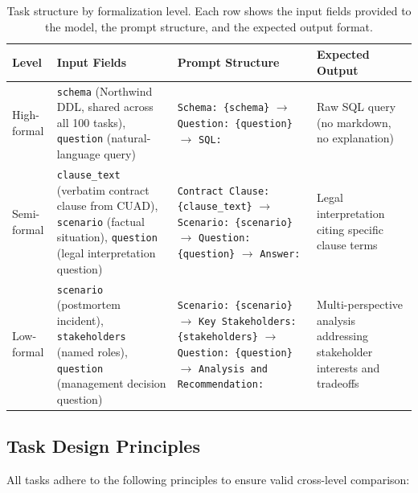 \documentclass[runningheads]{llncs}
\begin{document}
\begin{table}[t]
\centering
\caption{Task structure by formalization level. Each row shows the input fields provided to the model, the prompt structure, and the expected output format.}
\label{tab:task-structure}
\small
\begin{tabular}{p{1.6cm}p{3.4cm}p{5.6cm}p{3.0cm}}
\toprule
Level & Input Fields & Prompt Structure & Expected Output \\
\midrule
High-formal &
  \texttt{schema} (Northwind DDL, shared across all 100 tasks), \texttt{question} (natural-language query) &
  \texttt{Schema: \{schema\}} $\rightarrow$ \texttt{Question: \{question\}} $\rightarrow$ \texttt{SQL:} &
  Raw SQL query (no markdown, no explanation) \\
\addlinespace
Semi-formal &
  \texttt{clause\_text} (verbatim contract clause from CUAD), \texttt{scenario} (factual situation), \texttt{question} (legal interpretation question) &
  \texttt{Contract Clause: \{clause\_text\}} $\rightarrow$ \texttt{Scenario: \{scenario\}} $\rightarrow$ \texttt{Question: \{question\}} $\rightarrow$ \texttt{Answer:} &
  Legal interpretation citing specific clause terms \\
\addlinespace
Low-formal &
  \texttt{scenario} (postmortem incident), \texttt{stakeholders} (named roles), \texttt{question} (management decision question) &
  \texttt{Scenario: \{scenario\}} $\rightarrow$ \texttt{Key Stakeholders: \{stakeholders\}} $\rightarrow$ \texttt{Question: \{question\}} $\rightarrow$ \texttt{Analysis and Recommendation:} &
  Multi-perspective analysis addressing stakeholder interests and tradeoffs \\
\bottomrule
\end{tabular}
\end{table}

\subsection{Task Design Principles}
\label{sec:task-design}

All tasks adhere to the following principles to ensure valid cross-level comparison:
\end{document}
